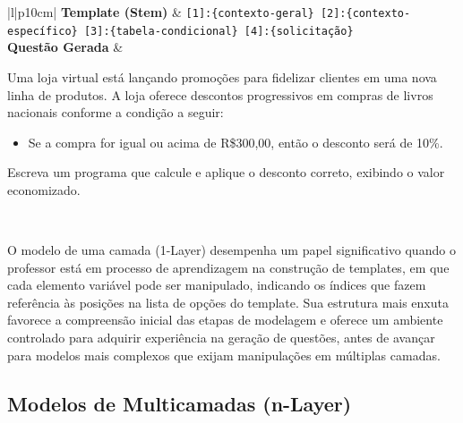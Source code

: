 \begin{table}[htbp]
\centering
\begin{tabular}{|l|p{10cm}|}
\hline
\textbf{Template (Stem)} 
& \texttt{[1]:\{contexto-geral\} [2]:\{contexto-específico\} [3]:\{tabela-condicional\} [4]:\{solicitação\}} \\
\hline
\textbf{Questão Gerada} 
& 
\begin{minipage}[t]{\linewidth}
\vspace{0.5em}
Uma loja virtual está lançando promoções para fidelizar clientes em uma nova linha de produtos.  
A loja oferece descontos progressivos em compras de livros nacionais conforme a condição a seguir:  
\begin{itemize}[leftmargin=1em]
    \item Se a compra for igual ou acima de R\$300,00, então o desconto será de 10\%.
\end{itemize}
Escreva um programa que calcule e aplique o desconto correto, exibindo o valor economizado. 
\vspace{0.5em}
\end{minipage} \\
\hline
\end{tabular}
\caption{Questão gerada (Autoria Própria, 2024)}
\label{tab:questao-gerada}
\end{table}



O modelo de uma camada (1-Layer) desempenha um papel significativo quando o professor está em processo de aprendizagem na construção de templates, em que cada elemento variável pode ser manipulado, indicando os índices que fazem referência às posições na lista de opções do template. Sua estrutura mais enxuta favorece a compreensão inicial das etapas de modelagem e oferece um ambiente controlado para adquirir experiência na geração de questões, antes de avançar para modelos mais complexos que exijam manipulações em múltiplas camadas.



\subsection{Modelos de Multicamadas (n-Layer)}